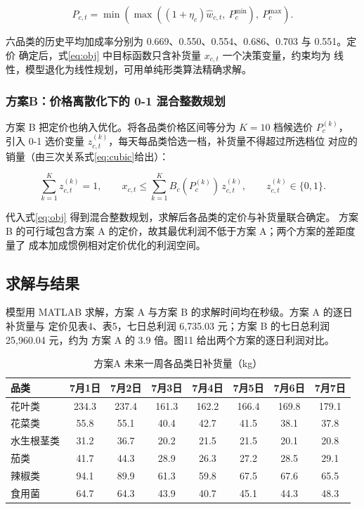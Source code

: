 \begin{equation}
P_{c,t}=\min\left(\max\left((1+\eta_c)\hat w_{c,t},\ P_c^{\min}\right),\ P_c^{\max}\right).
\label{eq:markup}
\end{equation}

六品类的历史平均加成率分别为 0.669、0.550、0.554、0.686、0.703 与 0.551。定价
确定后，式\eqref{eq:obj} 中目标函数只含补货量 $x_{c,t}$ 一个决策变量，约束均为
线性，模型退化为线性规划，可用单纯形类算法精确求解。

\subsubsection{方案B：价格离散化下的 0-1 混合整数规划}

方案 B 把定价也纳入优化。将各品类价格区间等分为 $K=10$ 档候选价 $P_c^{(k)}$，
引入 0-1 选价变量 $z_{c,t}^{(k)}$，每天每品类恰选一档，补货量不得超过所选档位
对应的销量（由三次关系式\eqref{eq:cubic}给出）：

\begin{equation}
\sum_{k=1}^{K}z_{c,t}^{(k)}=1,\qquad
x_{c,t}\le\sum_{k=1}^{K}B_c(P_c^{(k)})\,z_{c,t}^{(k)},\qquad z_{c,t}^{(k)}\in\{0,1\}.
\label{eq:milp}
\end{equation}

代入式\eqref{eq:obj} 得到混合整数规划，求解后各品类的定价与补货量联合确定。
方案 B 的可行域包含方案 A 的定价，故其最优利润不低于方案 A；两个方案的差距度量了
成本加成惯例相对定价优化的利润空间。

\subsection{求解与结果}

模型用 MATLAB 求解，方案 A 与方案 B 的求解时间均在秒级。方案 A 的逐日补货量与
定价见表4、表5，七日总利润 6,735.03 元；方案 B 的七日总利润 25,960.04 元，约为
方案 A 的 3.9 倍。图11 给出两个方案的逐日利润对比。

\begin{table}[H]
\centering
\caption{方案A 未来一周各品类日补货量（kg）}
\label{tab:q2xA}
\small
\begin{tabular}{lccccccc}
\toprule
品类 & 7月1日 & 7月2日 & 7月3日 & 7月4日 & 7月5日 & 7月6日 & 7月7日 \\
\midrule
花叶类 & 234.3 & 237.4 & 161.3 & 162.2 & 166.4 & 169.8 & 179.1 \\
花菜类 & 55.8 & 55.1 & 40.4 & 42.7 & 41.5 & 38.1 & 37.8 \\
水生根茎类 & 31.2 & 36.7 & 20.2 & 21.5 & 21.5 & 20.1 & 20.8 \\
茄类 & 41.7 & 44.3 & 28.9 & 26.3 & 27.2 & 28.5 & 29.1 \\
辣椒类 & 94.1 & 89.9 & 61.3 & 59.8 & 67.5 & 67.6 & 65.5 \\
食用菌 & 64.7 & 64.3 & 43.9 & 40.7 & 45.1 & 44.3 & 48.3 \\
\bottomrule
\end{tabular}
\end{table}

